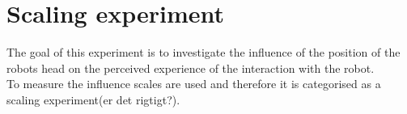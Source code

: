 \chapter*{Scaling experiment}
%
The goal of this experiment is to investigate the influence of the position of the robots head on the perceived experience of the interaction with the robot. 
\\
To measure the influence scales are used and therefore it is categorised as a scaling experiment(er det rigtigt?). 

